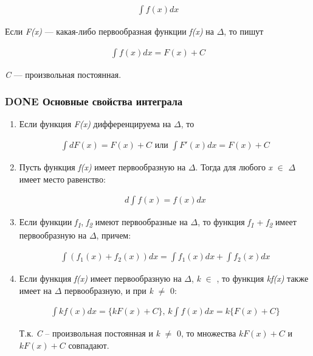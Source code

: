 \documentclass[11pt]{article}
\begin{document}
\begin{eqnarray}
\int f(x)dx
\end{eqnarray}

Если \emph{F(x)} — какая-либо первообразная функции \emph{f(x)} на \(\Delta\), то пишут

\begin{eqnarray}
\int f(x)dx=F(x)+C
\end{eqnarray}

\emph{C} — произвольная постоянная.

\subsubsection{{\bfseries\sffamily DONE} Основные свойства интеграла}
\label{sec:org8e88de6}
\begin{enumerate}
\item Если функция \emph{F(x)} дифференцируема на \(\Delta\), то
\label{sec:org0db314b}

\begin{eqnarray}
\int dF(x)=F(x)+C \text{ или }\int F'(x)dx=F(x)+C
\end{eqnarray}

\item Пусть функция \emph{f(x)} имеет первообразную на \(\Delta\). Тогда для любого \emph{x} \(\in\) \(\Delta\) имеет место равенство:
\label{sec:org1bd05d3}

\begin{eqnarray}
d\int f(x)=f(x)dx
\end{eqnarray}

\item Если функции \emph{f\textsubscript{1}}, \emph{f\textsubscript{2}} имеют первообразные на \(\Delta\), то функция \emph{f\textsubscript{1}} + \emph{f\textsubscript{2}} имеет первообразную на \(\Delta\), причем:
\label{sec:org21ac8f7}

\begin{eqnarray}
\int(f_1(x) + f_2(x))dx=\int f_1(x)dx + \int f_2(x)dx
\end{eqnarray}

\item Если функция \emph{f(x)} имеет первообразную на \(\Delta\), \emph{k} \(\in\) \emph{\R}, то функция \emph{kf(x)} также имеет на \(\Delta\) первообразную, и при \emph{k} \(\ne\) 0:
\label{sec:orge2d7824}

\begin{gather*}
\int kf(x)dx=\{kF(x)+C\}\text{, }k\int f(x)dx=k\{F(x)+C\}
\end{gather*}

Т.к. \emph{C} – произвольная постоянная и \emph{k} \(\ne\) 0, то множества \({kF(x) + C}\) и \(k{F(x) + C}\) совпадают.
\end{enumerate}
\end{document}
